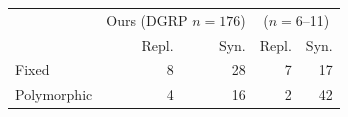 \begin{tabular}{lrrrr}
\toprule
 & \multicolumn{2}{c}{Ours (DGRP $n{=}176$)} & \multicolumn{2}{c}{\citeauthor{mcdonaldkreitman1991} ($n{=}6$--11)} \\
 & Repl. & Syn. & Repl. & Syn. \\
\midrule
Fixed        & 8 & 28 & 7 & 17 \\
Polymorphic  & 4 & 16 & 2 & 42 \\
\bottomrule
\end{tabular}
